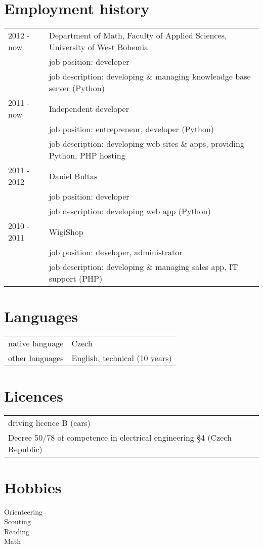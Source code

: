 \documentclass[12pt,a4paper]{article}
\begin{document}
\section*{Employment history}
\begin{tabular}{@{}p{2cm}l}
2012 - now & Department of Math, Faculty of Applied Sciences, University of West Bohemia \\
 & job position: developer\\
 & job description: developing \& managing knowleadge base server (Python)\\
2011 - now & Independent developer \\
 & job position: entrepreneur, developer (Python)\\
 & job description: developing web sites \& apps, providing Python, PHP hosting\\
2011 - 2012 & Daniel Bultas\\
 & job position: developer\\
 & job description: developing web app (Python)\\
2010 - 2011 & WigiShop\\
 & job position: developer, administrator\\
 & job description: developing \& managing sales app, IT support (PHP)\\
\end{tabular}

\section*{Languages}
\begin{tabular}{@{}p{4cm}l}
native language & Czech\\
other languages & English, technical (10 years)\\
\end{tabular}

\section*{Licences}
\begin{tabular}{@{}l}
driving licence  B (cars)\\
Decree 50/78 of competence in electrical engineering §4 (Czech Republic)\\
\end{tabular}

\section*{Hobbies}
Orienteering\\
Scouting\\
Reading\\
Math\\
\end{document}
